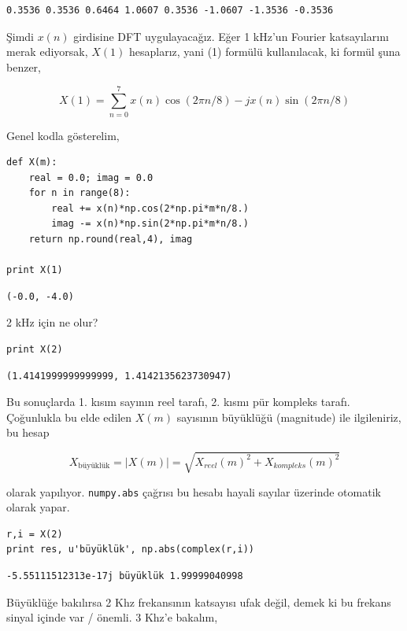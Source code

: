 \documentclass[12pt,fleqn]{article}\usepackage{../../common}
\begin{document}
\begin{verbatim}
0.3536 0.3536 0.6464 1.0607 0.3536 -1.0607 -1.3536 -0.3536
\end{verbatim}

Şimdi $x(n)$ girdisine DFT uygulayacağız. Eğer 1 kHz'un Fourier
katsayılarını merak ediyorsak, $X(1)$ hesaplarız, yani (1) formülü
kullanılacak, ki formül şuna benzer,

$$ X(1) = \sum _{n=0}^{7}  x(n)\cos(2\pi n / 8) - jx(n)\sin(2\pi n / 8) $$

Genel kodla gösterelim,

\begin{verbatim}
def X(m):
    real = 0.0; imag = 0.0
    for n in range(8): 
        real += x(n)*np.cos(2*np.pi*m*n/8.)
        imag -= x(n)*np.sin(2*np.pi*m*n/8.)
    return np.round(real,4), imag

print X(1)
\end{verbatim}

\begin{verbatim}
(-0.0, -4.0)
\end{verbatim}

2 kHz için ne olur?

\begin{verbatim}
print X(2)
\end{verbatim}

\begin{verbatim}
(1.4141999999999999, 1.4142135623730947)
\end{verbatim}

Bu sonuçlarda 1. kısım sayının reel tarafı, 2. kısmı pür kompleks
tarafı. Çoğunlukla bu elde edilen $X(m)$ sayısının büyüklüğü (magnitude) ile
ilgileniriz, bu hesap

$$ X_{\textrm{büyüklük}} = |X(m)| = \sqrt{X_{reel}(m)^2 + X_{kompleks}(m)^2}$$

olarak yapılıyor. \verb!numpy.abs! çağrısı bu hesabı hayali sayılar
üzerinde otomatik olarak yapar.

\begin{verbatim}
r,i = X(2)
print res, u'büyüklük', np.abs(complex(r,i))
\end{verbatim}

\begin{verbatim}
-5.55111512313e-17j büyüklük 1.99999040998
\end{verbatim}

Büyüklüğe bakılırsa 2 Khz frekansının katsayısı ufak değil, demek ki bu
frekans sinyal içinde var / önemli. 3 Khz'e bakalım,
\end{document}

